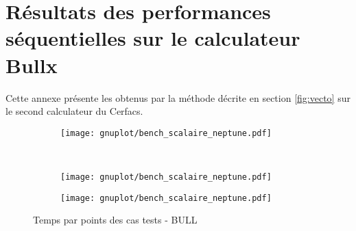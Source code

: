 \newpage
\section{Résultats des performances séquentielles sur le calculateur Bullx}\label{app:seq_neptune}

Cette annexe présente les obtenus par la méthode décrite en section \ref{fig:vecto} sur le second calculateur du Cerfacs.

\begin{figure}[!ht]
  \centering
  \begin{subfigure}[b]{0.5\textwidth}
    \centering
    \texttt{[image: gnuplot/bench\_scalaire\_neptune.pdf]}
  \caption{\label{fig:bench_scal_neptune_nonper}}
  \end{subfigure}%
  ~
  \begin{subfigure}[b]{0.5\textwidth}
    \centering
    \texttt{[image: gnuplot/bench\_scalaire\_neptune.pdf]}
  \caption{\label{fig:bench_scal_neptune_sym}}
  \end{subfigure}
  \begin{subfigure}[b]{0.5\textwidth}
    \centering
    \texttt{[image: gnuplot/bench\_scalaire\_neptune.pdf]}
  \caption{\label{fig:bench_scal_neptune_per}}
  \end{subfigure}
  \caption{\label{fig:bench_scal_neptune}Temps par points des cas tests - BULL}
\end{figure}


%


